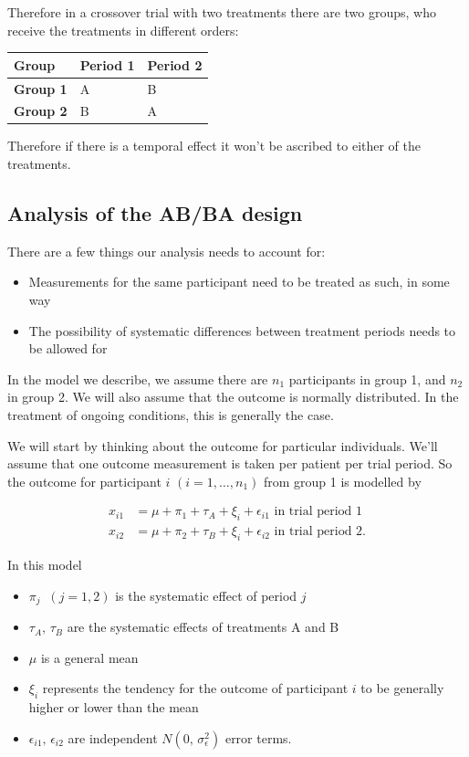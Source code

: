 \documentclass[
  openany]{book}
\providecommand{\tightlist}{%
  \setlength{\itemsep}{0pt}\setlength{\parskip}{0pt}}
\theoremstyle{definition}
\theoremstyle{definition}
\theoremstyle{definition}
\theoremstyle{definition}
\theoremstyle{remark}
\begin{document}
Therefore in a crossover trial with two treatments there are two groups, who receive the treatments in different orders:

\begin{longtable}[]{@{}lll@{}}
\toprule\noalign{}
Group & Period 1 & Period 2 \\
\midrule\noalign{}
\endhead
\bottomrule\noalign{}
\endlastfoot
\textbf{Group 1} & A & B \\
\textbf{Group 2} & B & A \\
\end{longtable}

Therefore if there is a temporal effect it won't be ascribed to either of the treatments.

\subsection{Analysis of the AB/BA design}\label{analysis-of-the-abba-design}

There are a few things our analysis needs to account for:

\begin{itemize}
\tightlist
\item
  Measurements for the same participant need to be treated as such, in some way
\item
  The possibility of systematic differences between treatment periods needs to be allowed for
\end{itemize}

In the model we describe, we assume there are \(n_1\) participants in group 1, and \(n_2\) in group 2. We will also assume that the outcome is normally distributed. In the treatment of ongoing conditions, this is generally the case.

We will start by thinking about the outcome for particular individuals. We'll assume that one outcome measurement is taken per patient per trial period. So the outcome for participant \(i\) \((i = 1,\ldots,n_1)\) from group 1 is modelled by

\begin{align*}
x_{i1} & = \mu + \pi_1 + \tau_A + \xi_i + \epsilon_{i1} \text{ in trial period 1}\\
x_{i2} & = \mu + \pi_2 + \tau_B + \xi_i + \epsilon_{i2} \text{ in trial period 2.}
\end{align*}

In this model

\begin{itemize}
\tightlist
\item
  \(\pi_j\;\;(j=1,2)\) is the systematic effect of period \(j\)
\item
  \(\tau_A,\,\tau_B\) are the systematic effects of treatments A and B
\item
  \(\mu\) is a general mean
\item
  \(\xi_i\) represents the tendency for the outcome of participant \(i\) to be generally higher or lower than the mean
\item
  \(\epsilon_{i1},\,\epsilon_{i2}\) are independent \(N\left(0,\,\sigma_{\epsilon}^2\right)\) error terms.
\end{itemize}
\end{document}
